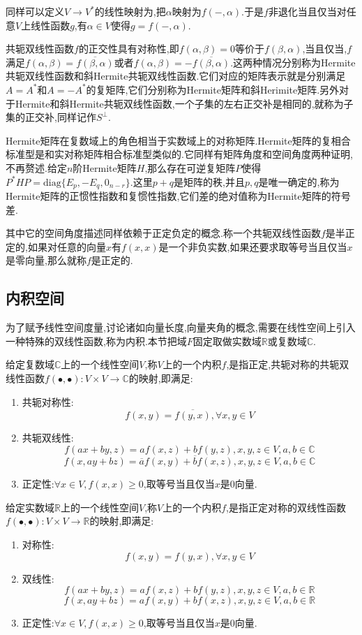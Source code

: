 同样可以定义$V\to V^*$的线性映射为,把$\alpha$映射为$f(-,\alpha)$.于是$f$非退化当且仅当对任意$V$上线性函数$g$,有$\alpha\in V$使得$g=f(-,\alpha)$.

共轭双线性函数$f$的正交性具有对称性,即$f(\alpha,\beta)=0$等价于$f(\beta,\alpha)$,当且仅当,$f$满足$f(\alpha,\beta)=\overline{f(\beta,\alpha)}$或者$f(\alpha,\beta)=-\overline{f(\beta,\alpha)}$.这两种情况分别称为Hermite共轭双线性函数和斜Hermite共轭双线性函数.它们对应的矩阵表示就是分别满足$A=A^*$和$A=-A^*$的复矩阵,它们分别称为Hermite矩阵和斜Herimite矩阵.另外对于Hermite和斜Hermite共轭双线性函数,一个子集的左右正交补是相同的,就称为子集的正交补,同样记作$S^{\perp}$.

Hermite矩阵在复数域上的角色相当于实数域上的对称矩阵.Hermite矩阵的复相合标准型是和实对称矩阵相合标准型类似的.它同样有矩阵角度和空间角度两种证明,不再赘述.给定$n$阶Hermite矩阵$H$,那么存在可逆复矩阵$P$使得$P^*HP=\mathrm{diag}\{E_p,-E_q,0_{n-r}\}$.这里$p+q$是矩阵的秩,并且$p,q$是唯一确定的,称为Hermite矩阵的正惯性指数和复惯性指数,它们差的绝对值称为Hermite矩阵的符号差.

其中它的空间角度描述同样依赖于正定负定的概念.称一个共轭双线性函数$f$是半正定的,如果对任意的向量$x$有$f(x,x)$是一个非负实数,如果还要求取等号当且仅当$x$是零向量,那么就称$f$是正定的.
\newpage
\subsection{内积空间}

为了赋予线性空间度量,讨论诸如向量长度,向量夹角的概念,需要在线性空间上引入一种特殊的双线性函数,称为内积.本节把域$F$固定取做实数域$\mathbb{R}$或复数域$\mathbb{C}$.

给定复数域$\mathbb{C}$上的一个线性空间$V$,称$V$上的一个内积$f$,是指正定,共轭对称的共轭双线性函数$f(\bullet,\bullet):V\times V\to\mathbb{C}$的映射,即满足:
\begin{enumerate}
	\item 共轭对称性:$$f(x,y)=\overline{f(y,x)},\forall x,y\in V$$
	\item 共轭双线性:$$f(ax+by,z)=af(x,z)+bf(y,z),x,y,z\in V,a,b\in\mathbb{C}$$
	$$f(x,ay+bz)=\overline{a}f(x,y)+\overline{b}f(x,z),x,y,z\in V,a,b\in\mathbb{C}$$
	\item 正定性:$\forall x\in V,f(x,x)\ge0$,取等号当且仅当$x$是0向量.
\end{enumerate}

给定实数域$\mathbb{R}$上的一个线性空间$V$,称$V$上的一个内积$f$,是指正定对称的双线性函数$f(\bullet,\bullet):V\times V\to\mathbb{R}$的映射,即满足:
\begin{enumerate}
	\item 对称性:$$f(x,y)=f(y,x),\forall x,y\in V$$
	\item 双线性:$$f(ax+by,z)=af(x,z)+bf(y,z),x,y,z\in V,a,b\in\mathbb{R}$$
	$$f(x,ay+bz)=af(x,y)+bf(x,z),x,y,z\in V,a,b\in\mathbb{R}$$
	\item 正定性:$\forall x\in V,f(x,x)\ge0$,取等号当且仅当$x$是0向量.
\end{enumerate}

